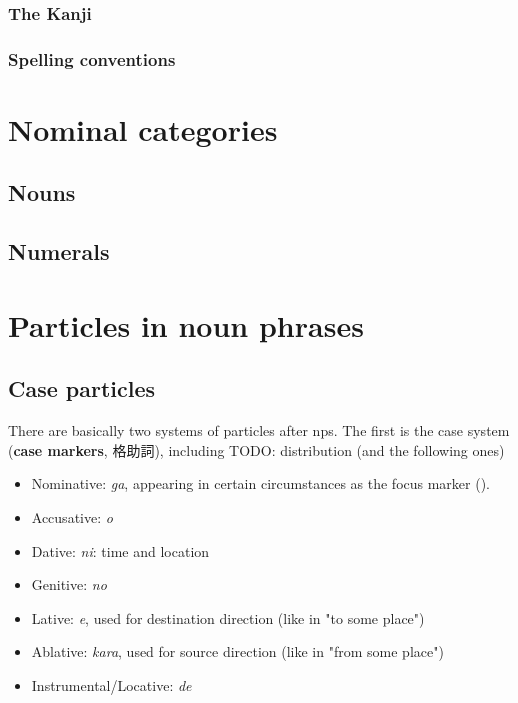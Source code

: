 \documentclass[UTF8, a4paper, oneside, scheme=plain]{ctexrep}
\newcommand*{\concept}[1]{\textbf{#1}}
\newcommand{\corpus}[1]{\emph{#1}}
\begin{document}
\subsection{The Kanji}


\subsection{Spelling conventions}

\chapter{Nominal categories}

\section{Nouns}

\section{Numerals}

\chapter{Particles in noun phrases}

\section{Case particles}\label{sec:case-particle}

There are basically two systems of particles after \ac{np}s.
The first is the case system (\concept{case markers}, 格助詞), including
TODO: distribution (and the following ones)
\begin{itemize}
    \item Nominative: \corpus{ga}, 
    appearing in certain circumstances as the focus marker ().
    \item Accusative: \corpus{o}
    \item Dative: \corpus{ni}: time and location 
    \item Genitive: \corpus{no} 
    \item Lative: \corpus{e}, used for destination direction (like in "to some place")
    \item Ablative: \corpus{kara}, used for source direction (like in "from some place")
    \item Instrumental/Locative: \corpus{de}
\end{itemize}
\end{document}
